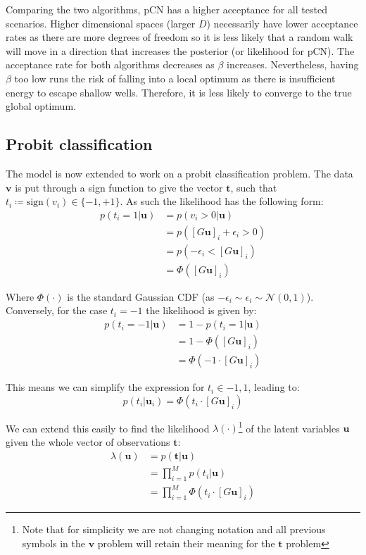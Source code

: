 \documentclass[]{article}
\newcommand{\Ncal}{\mathcal{N}}
\newcommand{\lik}{\lambda}
\newcommand{\tbold}{\boldsymbol{t}}
\newcommand{\ubold}{\boldsymbol{u}}
\newcommand{\vbold}{\boldsymbol{v}}
\begin{document}
Comparing the two algorithms, pCN has a higher acceptance for all tested scenarios. Higher dimensional spaces (larger $D$) necessarily have lower acceptance rates as there are more degrees of freedom so it is less likely that a random walk will move in a direction that increases the posterior (or likelihood for pCN). The acceptance rate for both algorithms decreases as $\beta$ increases. Nevertheless, having $\beta$ too low runs the risk of falling into a local optimum as there is insufficient energy to escape shallow wells. Therefore, it is less likely to converge to the true global optimum.

\subsection{Probit classification}

The model is now extended to work on a probit classification problem. The data $\vbold$ is put through a sign function to give the vector $\tbold$, such that $t_i \coloneqq \textrm{sign}(v_i) \in \{-1, +1\}$. As such the likelihood has the following form:
%
\begin{align}
	p(t_i = 1 | \ubold) &= p(v_i > 0 | \ubold) \nonumber \\
	&= p([G\ubold]_i + \epsilon_i > 0) \nonumber \\
	&= p(-\epsilon_i < [G\ubold]_i ) \nonumber \\
	&= \Phi([G\ubold]_i)
\end{align}

Where $\Phi(\cdot)$ is the standard Gaussian CDF (as $-\epsilon_i \sim \epsilon_i \sim \Ncal(0,1)$). Conversely, for the case $t_i = -1$ the likelihood is given by:
%
\begin{align}
	p(t_i = -1 | \ubold) &= 1 - p(t_i = 1 | \ubold) \nonumber \\
	&= 1 - \Phi([G\ubold]_i) \nonumber \\
	&= \Phi(-1 \cdot [G\ubold]_i)
\end{align}

This means we can simplify the expression for $t_i \in {-1, 1}$, leading to:
%
\begin{equation}
	p(t_i | \ubold_i) = \Phi(t_i \cdot [G\ubold]_i)
\end{equation}

We can extend this easily to find the likelihood $\lik(\cdot)$\footnote{Note that for simplicity we are not changing notation and all previous symbols in the $\vbold$ problem will retain their meaning for the $\tbold$ problem} of the latent variables $\ubold$ given the whole vector of observations $\tbold$:
%
\begin{align}
	\lik(\ubold) &= p(\tbold | \ubold) \nonumber \\
	&= \prod_{i=1}^{M} p(t_i | \ubold) \nonumber \\
	&= \prod_{i=1}^{M} \Phi(t_i \cdot [G\ubold]_i)
\end{align}
\end{document}

